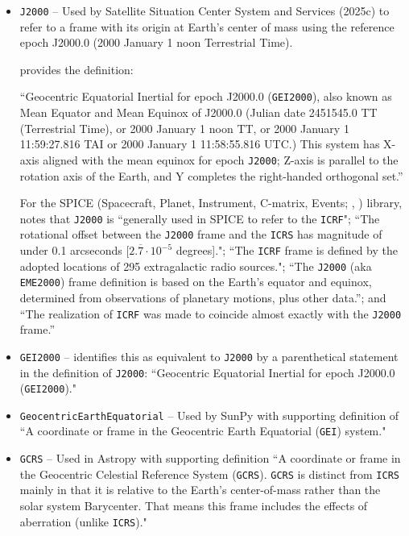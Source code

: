 \documentclass[draft]{agujournal2019}
\begin{document}
\begin{itemize}
    \parskip 0.1in 

    \item \texttt{J2000} -- Used by Satellite Situation Center System and Services (2025c) to refer to a frame with its origin at Earth's center of mass using the reference epoch J2000.0 (2000 January 1 noon Terrestrial Time).

      provides the definition:

     ``Geocentric Equatorial Inertial for epoch J2000.0 (\texttt{GEI2000}), also known as Mean Equator and Mean Equinox of J2000.0 (Julian date 2451545.0 TT (Terrestrial Time), or 2000 January 1 noon TT, or 2000 January 1 11:59:27.816 TAI or 2000 January 1 11:58:55.816 UTC.) This system has X-axis aligned with the mean equinox for epoch \texttt{J2000}; Z-axis is parallel to the rotation axis of the Earth, and Y completes the right-handed orthogonal set.''

    For the SPICE (Spacecraft, Planet, Instrument, C-matrix, Events; , ) library,  notes that \texttt{J2000} is ``generally used in SPICE to refer to the \texttt{ICRF}"; ``The rotational offset between the \texttt{J2000} frame and the \texttt{ICRS} has magnitude of under 0.1 arcseconds [$2.\overline{7}\cdot 10^{-5}$ degrees]."; ``The \texttt{ICRF} frame is defined by the adopted locations of 295 extragalactic radio sources."; ``The \texttt{J2000} (aka \texttt{EME2000}) frame definition is based on the Earth’s equator and equinox, determined from observations of planetary motions, plus other data.''; and ``The realization of \texttt{ICRF} was made to coincide almost exactly with the \texttt{J2000} frame.'' 

    \item \texttt{GEI2000} --  identifies this as equivalent to \texttt{J2000} by a parenthetical statement in the definition of \texttt{J2000}: ``Geocentric Equatorial Inertial for epoch J2000.0 (\texttt{GEI2000})."

    \item \texttt{GeocentricEarthEquatorial} -- Used by SunPy \cite{SunPy} with supporting definition of ``A coordinate or frame in the Geocentric Earth Equatorial (\texttt{GEI}) system."

    \item \texttt{GCRS} --  Used in Astropy \cite{AstroPy2022} with supporting definition ``A coordinate or frame in the Geocentric Celestial Reference System (\texttt{GCRS}). \texttt{GCRS} is distinct from \texttt{ICRS} mainly in that it is relative to the Earth’s center-of-mass rather than the solar system Barycenter. That means this frame includes the effects of aberration (unlike \texttt{ICRS})."


\end{itemize}
\end{document}

